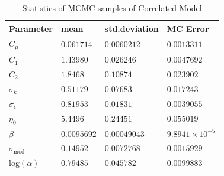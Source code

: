\documentclass[11pt,titlepage]{article}
\begin{document}
\begin{table}[htbp]
	\centering
	    \caption{Statistics of MCMC samples of Correlated Model}
		\begin{tabular}{l l l l}
			\hline \hline
			Parameter										& mean 				& std.deviation			& MC Error 		\\
			\hline
			$C_\mu$											& $0.061714$	& $0.0060212$ 			& $0.0013311$ \\
			$C_1$												& $1.43980$	 	& $0.026246$ 				& $0.0047692 $ \\
			$C_2$												& $1.8468$ 		&	$0.10874$ 				& $0.023902$ \\
			$\sigma_k$									& $0.51179$ 	& $0.07683$ 				& $0.017243$ \\
			$\sigma_\epsilon$						& $0.81953$ 	& $0.01831$ 				& $0.0039055$ \\
			$\eta_0$										& $5.4496$ 		& $0.24451$ 				& $0.055019$ \\
			$\beta$							   			& $0.0095692$ & $0.00049043$ 			& $9.8941 \times 10^{-5}$ \\
			$\sigma_{\text{mod}}$				& $0.14952$ 	& $0.0072768$ 			& $0.0015929$ \\
			$\text{log}(\alpha)$				& $0.79485$ 	& $0.045782$ 				& $0.0099883$ \\       
			\hline
		\end{tabular}
	\label{tab:StatMCMCCorr}
\end{table}
\end{document}
